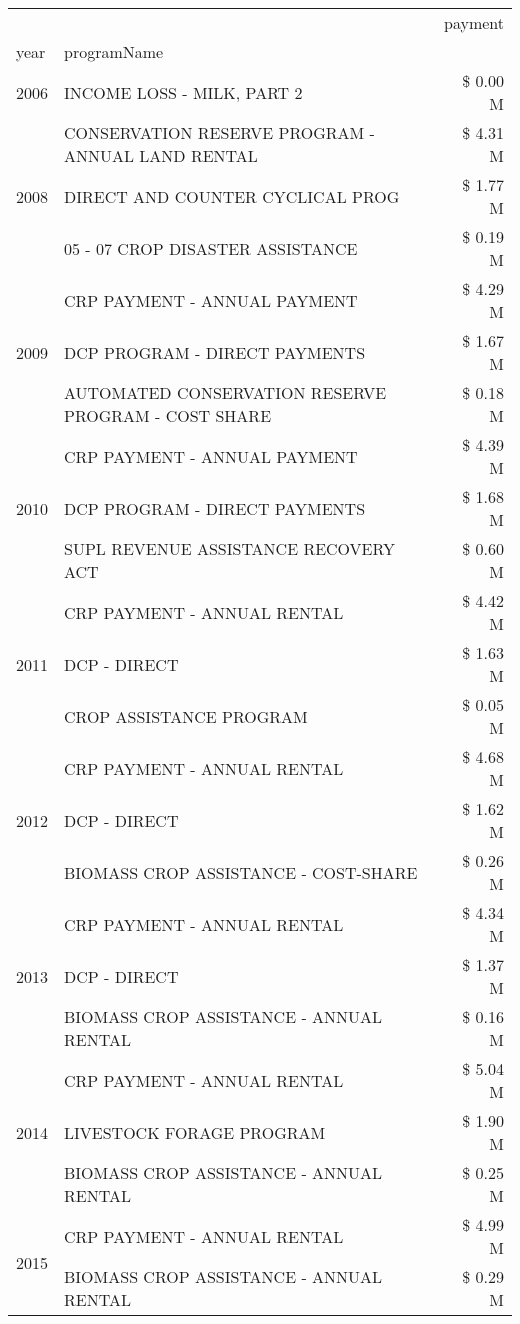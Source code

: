\begin{tabular}{llr}
\toprule
 &  & payment \\
year & programName &  \\
\midrule
2006 & INCOME LOSS - MILK, PART 2 & \$ 0.00 M \\
\cline{1-3}
\multirow[t]{3}{*}{2008} & CONSERVATION RESERVE PROGRAM - ANNUAL LAND RENTAL & \$ 4.31 M \\
 & DIRECT AND COUNTER CYCLICAL PROG & \$ 1.77 M \\
 & 05 - 07 CROP DISASTER ASSISTANCE & \$ 0.19 M \\
\cline{1-3}
\multirow[t]{3}{*}{2009} & CRP PAYMENT - ANNUAL PAYMENT & \$ 4.29 M \\
 & DCP PROGRAM - DIRECT PAYMENTS & \$ 1.67 M \\
 & AUTOMATED CONSERVATION RESERVE PROGRAM - COST SHARE & \$ 0.18 M \\
\cline{1-3}
\multirow[t]{3}{*}{2010} & CRP PAYMENT - ANNUAL PAYMENT & \$ 4.39 M \\
 & DCP PROGRAM - DIRECT PAYMENTS & \$ 1.68 M \\
 & SUPL REVENUE ASSISTANCE RECOVERY ACT & \$ 0.60 M \\
\cline{1-3}
\multirow[t]{3}{*}{2011} & CRP PAYMENT - ANNUAL RENTAL & \$ 4.42 M \\
 & DCP - DIRECT & \$ 1.63 M \\
 & CROP ASSISTANCE PROGRAM & \$ 0.05 M \\
\cline{1-3}
\multirow[t]{3}{*}{2012} & CRP PAYMENT - ANNUAL RENTAL & \$ 4.68 M \\
 & DCP - DIRECT & \$ 1.62 M \\
 & BIOMASS CROP ASSISTANCE - COST-SHARE & \$ 0.26 M \\
\cline{1-3}
\multirow[t]{3}{*}{2013} & CRP PAYMENT - ANNUAL RENTAL & \$ 4.34 M \\
 & DCP - DIRECT & \$ 1.37 M \\
 & BIOMASS CROP ASSISTANCE - ANNUAL RENTAL & \$ 0.16 M \\
\cline{1-3}
\multirow[t]{3}{*}{2014} & CRP PAYMENT - ANNUAL RENTAL & \$ 5.04 M \\
 & LIVESTOCK FORAGE PROGRAM & \$ 1.90 M \\
 & BIOMASS CROP ASSISTANCE - ANNUAL RENTAL & \$ 0.25 M \\
\cline{1-3}
\multirow[t]{3}{*}{2015} & CRP PAYMENT - ANNUAL RENTAL & \$ 4.99 M \\
 & BIOMASS CROP ASSISTANCE - ANNUAL RENTAL & \$ 0.29 M \\

\end{tabular}
